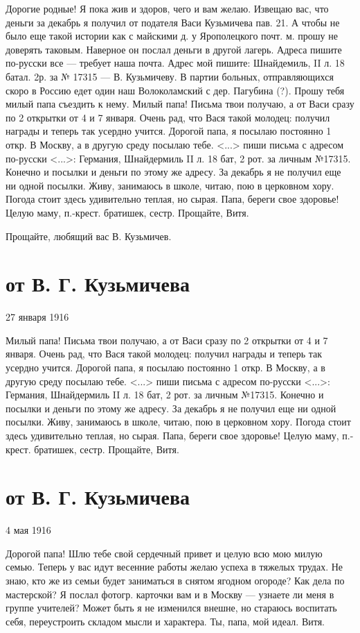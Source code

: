 \documentclass[]{memoir}
\begin{document}
Дорогие родные! Я пока жив и здоров, чего и вам желаю. Извещаю вас, что деньги за декабрь я получил от подателя Васи Кузьмичева пав. 21. А чтобы не было еще такой истории как с майскими д. у Ярополецкого почт. м. прошу не доверять таковым. Наверное он послал деньги в другой лагерь. Адреса пишите по-русски все — требует наша почта. Адрес мой пишите: Шнайдемиль, II л. 18 батал. 2р. за № 17315 — В. Кузьмичеву. В партии больных, отправляющихся скоро в Россию едет один наш Волоколамский с дер. Пагубина (?). Прошу тебя милый папа съездить к нему. Милый папа! Письма твои получаю, а от Васи сразу по 2 открытки от 4 и 7 января. Очень рад, что Вася такой молодец: получил награды и теперь так усердно учится. Дорогой папа, я посылаю постоянно 1 откр. В Москву, а в другую среду посылаю тебе. <...> пиши письма с адресом по-русски <...>: Германия, Шнайдермиль II л. 18 бат, 2 рот. за личным №17315. Конечно и посылки и деньги по этому же адресу. За декабрь я не получил еще ни одной посылки. Живу, занимаюсь в школе, читаю, пою в церковном хору. Погода стоит здесь удивительно теплая, но сырая. Папа, береги свое здоровье! Целую маму, п.-крест. братишек, сестр. Прощайте, Витя.

Прощайте, любящий вас В. Кузьмичев.

\section{от В. Г. Кузьмичева}
27 января 1916

Милый папа! Письма твои получаю, а от Васи сразу по 2 открытки от 4 и 7 января. Очень рад, что Вася такой молодец: получил награды и теперь так усердно учится. Дорогой папа, я посылаю постоянно 1 откр. В Москву, а в другую среду посылаю тебе. <...> пиши письма с адресом по-русски <...>: Германия, Шнайдермиль II л. 18 бат, 2 рот. за личным №17315. Конечно и посылки и деньги по этому же адресу. За декабрь я не получил еще ни одной посылки. Живу, занимаюсь в школе, читаю, пою в церковном хору. Погода стоит здесь удивительно теплая, но сырая. Папа, береги свое здоровье! Целую маму, п.-крест. братишек, сестр. Прощайте, Витя.

\section{от В. Г. Кузьмичева}
4 мая 1916

Дорогой папа! Шлю тебе свой сердечный привет и целую всю мою милую семью. Теперь у вас идут весенние работы желаю успеха в тяжелых трудах. Не знаю, кто же из семьи будет заниматься в снятом ягодном огороде? Как дела по мастерской? Я послал фотогр. карточки вам и в Москву — узнаете ли меня в группе учителей? Может быть я не изменился внешне, но стараюсь воспитать себя, переустроить складом мысли и характера. Ты, папа, мой идеал. Витя.
\end{document}
